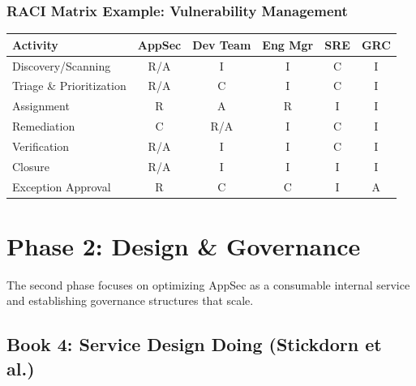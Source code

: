 \documentclass[11pt,letterpaper]{article}
\begin{document}
\subsubsection{RACI Matrix Example: Vulnerability Management}

\begin{center}
\renewcommand{\arraystretch}{1.2}
\footnotesize
\begin{tabular}{lccccc}
\toprule
\textbf{Activity} & \textbf{AppSec} & \textbf{Dev Team} & \textbf{Eng Mgr} & \textbf{SRE} & \textbf{GRC} \\
\midrule
Discovery/Scanning & R/A & I & I & C & I \\
Triage \& Prioritization & R/A & C & I & C & I \\
Assignment & R & A & R & I & I \\
Remediation & C & R/A & I & C & I \\
Verification & R/A & I & I & C & I \\
Closure & R/A & I & I & I & I \\
Exception Approval & R & C & C & I & A \\
\bottomrule
\end{tabular}
\end{center}

\newpage

\section{Phase 2: Design \& Governance}

The second phase focuses on optimizing AppSec as a consumable internal service and establishing governance structures that scale.

\subsection{Book 4: Service Design Doing (Stickdorn et al.)}
\end{document}
